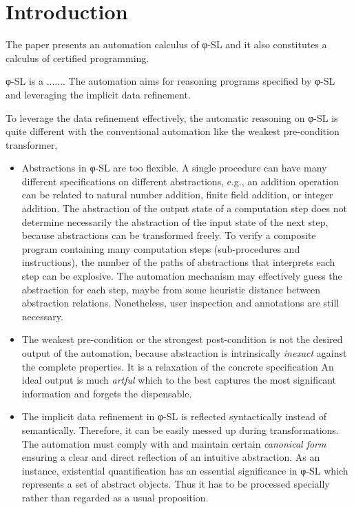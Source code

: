\section{Introduction}

The paper presents an automation calculus of φ-SL and it also constitutes a calculus of certified programming.

φ-SL is a .......
The automation aims for reasoning programs specified by φ-SL and leveraging the implicit data refinement.

To leverage the data refinement effectively, the automatic reasoning on φ-SL is quite different with the conventional automation like the weakest pre-condition transformer,
\begin{itemize}
\item Abstractions in φ-SL are too flexible.
A single procedure can have many different specifications on different abstractions, e.g., an addition operation can be related to natural number addition, finite field addition, or integer addition.
The abstraction of the output state of a computation step does not determine necessarily the abstraction of the input state of the next step, because abstractions can be transformed freely.
To verify a composite program containing many computation steps (sub-procedures and instructions), the number of the paths of abstractions that interprets each step can be explosive.
The automation mechanism may effectively guess the abstraction for each step, maybe from some heuristic distance between abstraction relations. Nonetheless, user inspection and annotations are still necessary.

\item The weakest pre-condition or the strongest post-condition is not the desired output of the automation, because abstraction is intrinsically \emph{inexact} against the complete properties.
It is a relaxation of the concrete specification
An ideal output is much \emph{artful} which to the best captures the most significant information and forgets the dispensable.

\item The implicit data refinement in φ-SL is reflected syntactically instead of semantically. Therefore, it can be easily messed up during transformations.
  The automation must comply with and maintain certain \emph{canonical form} ensuring a clear and direct reflection of an intuitive abstraction.
  As an instance, existential quantification has an essential significance in φ-SL which represents a set of abstract objects. Thus it has to be processed specially rather than regarded as a usual proposition.

\end{itemize}

